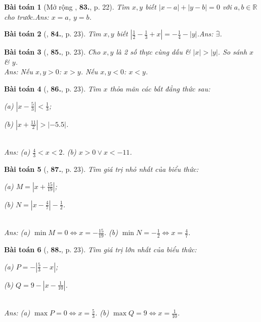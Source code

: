 \documentclass{article}
\numberwithin{equation}{section}
\newtheorem{baitoan}{Bài toán}
\begin{document}
\begin{baitoan}[Mở rộng \cite{Tuyen_Toan_7}, \textbf{83.}, p. 22]
	Tìm $x,y$ biết $|x - a| + |y - b| = 0$ với $a,b\in\mathbb{R}$ cho trước.\hfill\textsf{Ans:} $x = a$, $y = b$.
\end{baitoan}

\begin{baitoan}[\cite{Tuyen_Toan_7}, \textbf{84.}, p. 23]
	Tìm $x,y$ biết $\left|\frac{1}{2} - \frac{1}{3} + x\right| = -\frac{1}{4} - |y|$.\hfill\textsf{Ans:} $\overline{\exists}$.
\end{baitoan}

\begin{baitoan}[\cite{Tuyen_Toan_7}, \textbf{85.}, p. 23]
	Cho $x,y$ là 2 số thực cùng dấu \& $|x| > |y|$. So sánh $x$ \& $y$.\\\mbox{}\hfill\textsf{Ans:} Nếu $x,y > 0$: $x > y$. Nếu $x,y < 0$: $x < y$.
\end{baitoan}

\begin{baitoan}[\cite{Tuyen_Toan_7}, \textbf{86.}, p. 23]
	Tìm $x$ thỏa mãn các bất đẳng thức sau:
	\begin{enumerate*}
		\item[(a)] $\left|x - \frac{5}{3}\right| < \frac{1}{3}$;
		\item[(b)] $\left|x + \frac{11}{2}\right| > |-5.5|$.
	\end{enumerate*}\\\mbox{}\hfill\textsf{Ans:} (a) $\frac{4}{3} < x < 2$. (b) $x > 0\lor x < -11$.
\end{baitoan}

\begin{baitoan}[\cite{Tuyen_Toan_7}, \textbf{87.}, p. 23]
	Tìm giá trị nhỏ nhất của biểu thức:
	\begin{enumerate*}
		\item[(a)] $M = \left|x + \frac{15}{19}\right|$;
		\item[(b)] $N = \left|x - \frac{4}{7}\right| - \frac{1}{2}$.
	\end{enumerate*}\\\mbox{}\hfill\textsf{Ans:} (a) $\min M = 0\Leftrightarrow x = -\frac{15}{19}$. (b) $\min N = -\frac{1}{2}\Leftrightarrow x = \frac{4}{7}$.
\end{baitoan}

\begin{baitoan}[\cite{Tuyen_Toan_7}, \textbf{88.}, p. 23]
	Tìm giá trị lớn nhất của biểu thức:
	\begin{enumerate*}
		\item[(a)] $P = -\left|\frac{5}{3} - x\right|$;
		\item[(b)] $Q = 9 - \left|x - \frac{1}{10}\right|$.
	\end{enumerate*}\\\mbox{}\hfill\textsf{Ans:} (a) $\max P = 0\Leftrightarrow x = \frac{5}{3}$. (b) $\max Q = 9\Leftrightarrow x = \frac{1}{10}$.
\end{baitoan}
\end{document}
